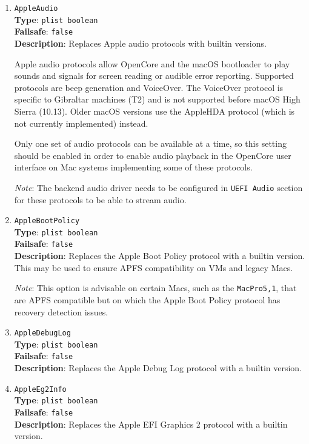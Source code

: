 \documentclass[]{article}
\begin{document}
\begin{enumerate}

\item
  \texttt{AppleAudio}\\
  \textbf{Type}: \texttt{plist\ boolean}\\
  \textbf{Failsafe}: \texttt{false}\\
  \textbf{Description}: Replaces Apple audio protocols with builtin
  versions.

  Apple audio protocols allow OpenCore and the macOS bootloader to play
  sounds and signals for screen reading or audible error reporting.
  Supported protocols are beep generation and VoiceOver. The VoiceOver protocol
  is specific to Gibraltar machines (T2) and is not supported before
  macOS High Sierra (10.13). Older macOS versions use the AppleHDA protocol
  (which is not currently implemented) instead.

  Only one set of audio protocols can be available at a time, so this setting should
  be enabled in order to enable audio playback in the OpenCore user interface on Mac
  systems implementing some of these protocols.

  \emph{Note}: The backend audio driver needs to be configured in \texttt{UEFI Audio}
  section for these protocols to be able to stream audio.

\item
  \texttt{AppleBootPolicy}\\
  \textbf{Type}: \texttt{plist\ boolean}\\
  \textbf{Failsafe}: \texttt{false}\\
  \textbf{Description}: Replaces the Apple Boot Policy protocol with a builtin
  version. This may be used to ensure APFS compatibility on VMs and legacy Macs.

  \emph{Note}: This option is advisable on certain Macs, such as
  the \texttt{MacPro5,1}, that are APFS compatible but on which
  the Apple Boot Policy protocol has recovery detection issues.

\item
  \texttt{AppleDebugLog}\\
  \textbf{Type}: \texttt{plist\ boolean}\\
  \textbf{Failsafe}: \texttt{false}\\
  \textbf{Description}: Replaces the Apple Debug Log protocol with a builtin
  version.

\item
  \texttt{AppleEg2Info}\\
  \textbf{Type}: \texttt{plist\ boolean}\\
  \textbf{Failsafe}: \texttt{false}\\
  \textbf{Description}: Replaces the Apple EFI Graphics 2 protocol with a builtin
  version.


\end{enumerate}
\end{document}
